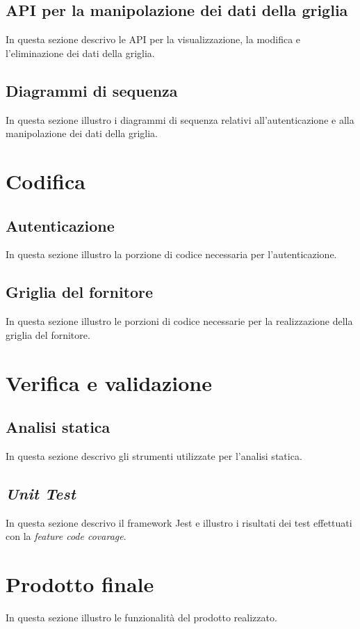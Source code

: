 \subsection{API per la manipolazione dei dati della griglia}
In questa sezione descrivo le API per la visualizzazione, la modifica e l'eliminazione dei dati della griglia.

\subsection{Diagrammi di sequenza}
In questa sezione illustro i diagrammi di sequenza relativi all'autenticazione e alla manipolazione dei dati della griglia.

\section{Codifica}

\subsection{Autenticazione}
In questa sezione illustro la porzione di codice necessaria per l'autenticazione.

\subsection{Griglia del fornitore}
In questa sezione illustro le porzioni di codice necessarie per la realizzazione della griglia del fornitore.

\section{Verifica e validazione}

\subsection{Analisi statica}
In questa sezione descrivo gli strumenti utilizzate per l'analisi statica.

\subsection{\emph{Unit Test}}
In questa sezione descrivo il framework Jest e illustro i risultati dei test effettuati con la \emph{feature code covarage}.

\section{Prodotto finale}
In questa sezione illustro le funzionalità del prodotto realizzato.